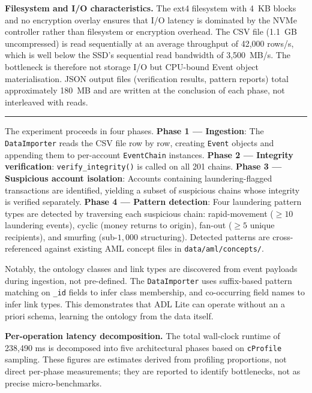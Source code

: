 \textbf{Filesystem and I/O characteristics.} The ext4 filesystem with 4~KB blocks and no encryption overlay ensures that I/O latency is dominated by the NVMe controller rather than filesystem or encryption overhead. The CSV file (1.1~GB uncompressed) is read sequentially at an average throughput of 42,000 rows/s, which is well below the SSD's sequential read bandwidth of 3,500~MB/s. The bottleneck is therefore not storage I/O but CPU-bound Event object materialisation. JSON output files (verification results, pattern reports) total approximately 180~MB and are written at the conclusion of each phase, not interleaved with reads.

\begin{center}\rule{0.5\linewidth}{0.5pt}\end{center}

The experiment proceeds in four phases. \textbf{Phase 1 --- Ingestion}: The \texttt{DataImporter} reads the CSV file row by row, creating \texttt{Event} objects and appending them to per-account \texttt{EventChain} instances. \textbf{Phase 2 --- Integrity verification}: \texttt{verify\_integrity()} is called on all 201 chains. \textbf{Phase 3 --- Suspicious account isolation}: Accounts containing laundering-flagged transactions are identified, yielding a subset of suspicious chains whose integrity is verified separately. \textbf{Phase 4 --- Pattern detection}: Four laundering pattern types are detected by traversing each suspicious chain: rapid-movement ($\geq 10$ laundering events), cyclic (money returns to origin), fan-out ($\geq 5$ unique recipients), and smurfing (sub-$1,000$ structuring). Detected patterns are cross-referenced against existing AML concept files in \texttt{data/aml/concepts/}.

Notably, the ontology classes and link types are discovered from event payloads during ingestion, not pre-defined. The \texttt{DataImporter} uses suffix-based pattern matching on \texttt{\_id} fields to infer class membership, and co-occurring field names to infer link types. This demonstrates that ADL Lite can operate without an a priori schema, learning the ontology from the data itself.

\textbf{Per-operation latency decomposition.} The total wall-clock runtime of 238,490 ms is decomposed into five architectural phases based on \texttt{cProfile} sampling. These figures are estimates derived from profiling proportions, not direct per-phase measurements; they are reported to identify bottlenecks, not as precise micro-benchmarks.


